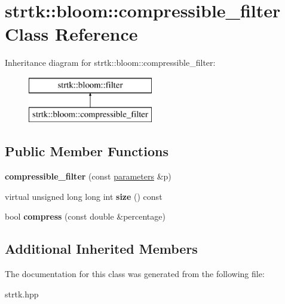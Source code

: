 \hypertarget{classstrtk_1_1bloom_1_1compressible__filter}{\section{strtk\-:\-:bloom\-:\-:compressible\-\_\-filter Class Reference}
\label{classstrtk_1_1bloom_1_1compressible__filter}
}
Inheritance diagram for strtk\-:\-:bloom\-:\-:compressible\-\_\-filter\-:\begin{figure}[H]
\begin{center}
\leavevmode
\includegraphics[height=2.000000cm]{classstrtk_1_1bloom_1_1compressible__filter}
\end{center}
\end{figure}
\subsection*{Public Member Functions}
\begin{DoxyCompactItemize}
\item 
\hypertarget{classstrtk_1_1bloom_1_1compressible__filter_a91e789f22f79ccebd6b5cfe74686357a}{{\bfseries compressible\-\_\-filter} (const \hyperlink{classstrtk_1_1bloom_1_1parameters}{parameters} \&p)}\label{classstrtk_1_1bloom_1_1compressible__filter_a91e789f22f79ccebd6b5cfe74686357a}

\item 
\hypertarget{classstrtk_1_1bloom_1_1compressible__filter_aa3f4cf27e089b0cbebd93e041adbcd27}{virtual unsigned long long int {\bfseries size} () const }\label{classstrtk_1_1bloom_1_1compressible__filter_aa3f4cf27e089b0cbebd93e041adbcd27}

\item 
\hypertarget{classstrtk_1_1bloom_1_1compressible__filter_a558c41b3517cf726e2af09571df1aee7}{bool {\bfseries compress} (const double \&percentage)}\label{classstrtk_1_1bloom_1_1compressible__filter_a558c41b3517cf726e2af09571df1aee7}

\end{DoxyCompactItemize}
\subsection*{Additional Inherited Members}


The documentation for this class was generated from the following file\-:\begin{DoxyCompactItemize}
\item 
strtk.\-hpp\end{DoxyCompactItemize}
